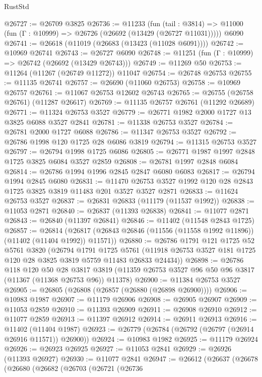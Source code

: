 \begin{lexlean}{RustStd}
\begin{coremodule}
@26727 := @26709 @3825
@26736 := @11233
    (fun (tail : @3814) => @11000 (fun (Γ : @10999) => @26726 (@26692 (@13429 (@26727 @11031)))))
    @6090
@26741 := @26618 (@11019 (@26683 (@13423 (@11028 @6091))))
@26742 := @10969 @26741
@26743 := @26727 @6090
@26748 := @11251 (fun (Γ : @10999) => @26742 (@26692 (@13429 @26743)))
@26749 := @11269 @50
@26753 := @11264 (@11267 (@26749 @11272)) @11047
@26754 := @26748 @26753
@26755 := @11135 @26741
@26757 := @26690 (@11060 @26753)
@26758 := @10969 @26757
@26761 := @11067 @26753 @12602 @26743
@26765 := @26755 (@26758 @26761) (@11287 @26617)
@26769 := @11135 @26757 @26761 (@11292 @26689)
@26771 := @11324 @26753 @3527
@26779 := @26771 @1982 @2000 @1727 @13 @3825 @6088 @3527 @2841
@26781 := @11338 @26753 @3527
@26784 := @26781 @2000 @1727 @6088
@26786 := @11347 @26753 @3527
@26792 := @26786 @1998 @120 @1725 @28 @6086 @3819
@26794 := @11315 @26753 @3527
@26797 := @26794 @1998 @1725 @6086
@26805 := @26771 @1987 @1997 @2848 @1725 @3825 @6084 @3527 @2859
@26808 := @26781 @1997 @2848 @6084
@26814 := @26786 @1994 @1996 @2845 @2847 @6080 @6083
@26817 := @26794 @1994 @2845 @6080
@26831 := @11470 @26753 @3527 @1992 @120 @28 @2843 @1725 @3825 @3819 @11483 @201 @3527 @3527 @2871
@26833 := @11624 @26753 @3527
@26837 := @26831 @26833 (@11179 (@11537 @1992))
@26838 := @11053 @2871
@26840 := @26837 (@11393 @26838)
@26841 := @11077 @2871
@26843 := @26840 (@11397 @26841)
@26846 := @11402 (@11548 @2843 @1725)
@26857 := @26814
    (@26817 (@26843 @26846 (@11556 (@11558 @1992 @11896)) (@11402 (@11404 @1992)) @11571))
@26880 := @26786
    @1791
    @121
    @1725
    @52
    @5761
    @3820
    (@26794
      @1791
      @1725
      @5761
      (@11918 @26753 @3527 @181 @1725 @120 @28 @3825 @3819 @5759 @11483 @26833 @24434))
@26898 := @26786
    @118
    @120
    @50
    @28
    @3817
    @3819
    (@11359 @26753 @3527 @96 @50 @96 @3817 (@11367 (@11368 @26753 @96)) @11378)
@26900 := @11384 @26753 @3527
@26905 := @26805 (@26808 (@26857 (@26880 (@26898 @26900))))
@26906 := @10983 @1987
@26907 := @11179 @26906
@26908 := @26905 @26907
@26909 := @11053 @2859
@26910 := @11393 @26909
@26911 := @26908 @26910
@26912 := @11077 @2859
@26913 := @11397 @26912
@26914 := @26911 @26913
@26916 := @11402 (@11404 @1987)
@26923 := @26779 (@26784 (@26792 (@26797 (@26914 @26916 @11571)) @26900))
@26924 := @10983 @1982
@26925 := @11179 @26924
@26926 := @26923 @26925
@26927 := @11053 @2841
@26929 := @26926 (@11393 @26927)
@26930 := @11077 @2841
@26947 := @26612
    (@26637
      (@26678
        (@26680
          (@26682
            (@26703
              (@26721
                (@26736

\end{coremodule}
\end{lexlean}
